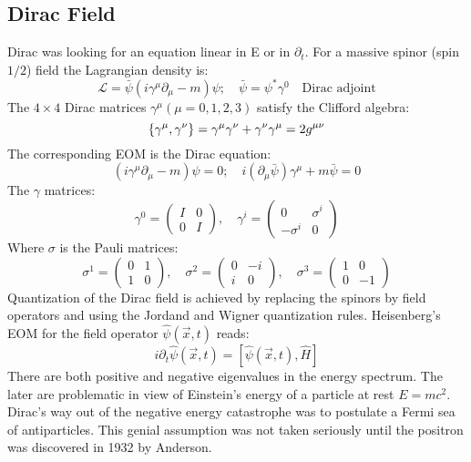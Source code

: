 \subsection{Dirac Field}
Dirac was looking for an equation linear in E or in $\partial_t$. For a
massive spinor (spin $1/2$) field the Lagrangian density is:
$$ \mathcal{L} = \bar{\psi}(i\gamma^{\mu}\partial_{\mu} - m)\psi; \quad
\bar{\psi} = \psi^{*}\gamma^{0} \quad \text{Dirac adjoint} $$
The $4 \times 4$ Dirac matrices $\gamma^{\mu} (\mu = 0,1,2,3)$ satisfy the
Clifford algebra:
$$ \{\gamma^{\mu}, \gamma^{\nu}\} = \gamma^{\mu} \gamma^{\nu} +
\gamma^{\nu} \gamma^{\mu} = 2g^{\mu\nu}$$
The corresponding EOM is the Dirac equation:
$$ (i\gamma^{\mu}\partial_{\mu} - m) \psi =0;	\quad
i(\partial_{\mu}\bar{\psi})\gamma^{\mu} + m\bar{\psi} = 0$$
The $\gamma$ matrices:
$$ \gamma^{0} = 
    \begin{pmatrix}
	I   & 0	\\
	0   & I	
    \end{pmatrix}, \quad
    \gamma^{i} = 
    \begin{pmatrix}
	0   & \sigma^{i}    \\
	-\sigma^{i} & 0	    
    \end{pmatrix}
$$
Where \textbf{$\sigma$} is the Pauli matrices:
\begin{equation}
    \sigma^{1} = 
	\begin{pmatrix}
	    0	& 1 \\
	    1	& 0 
	\end{pmatrix},	\quad
    \sigma^{2} = 
	\begin{pmatrix}
	    0	& -i \\
	    i	& 0 
	\end{pmatrix},	\quad
    \sigma^{3} = 
	\begin{pmatrix}
	    1	& 0 \\
	    0	& -1 
	\end{pmatrix}
    \label{Pauli Matrices}
\end{equation}
Quantization of the Dirac field is achieved by replacing the spinors by
field operators and using the Jordand and Wigner quantization rules.
Heisenberg's EOM for the field operator $\hat{\psi}(\vec{x}, t)$
reads:
$$ i\partial_{t}\hat{\psi}(\vec{x}, t) = [
    \hat{\psi}(\vec{x}, t), \hat{H}]$$
There are both positive and negative eigenvalues in the energy spectrum. The
later are problematic in view of Einstein’s energy of a particle at rest 
$ E = mc^2 $. Dirac’s way out of the negative energy catastrophe was to 
postulate a Fermi sea of antiparticles. This genial assumption was not 
taken seriously until the positron was discovered in 1932 by Anderson.


